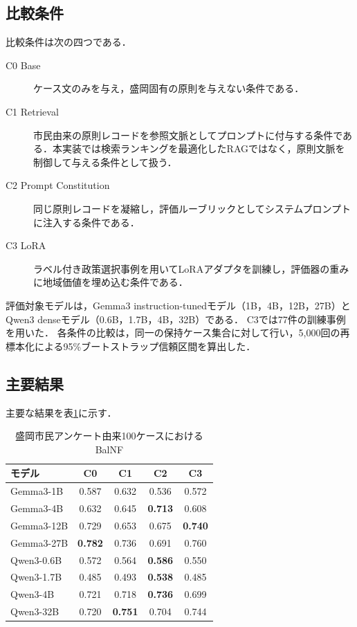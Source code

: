 \subsection{比較条件}

比較条件は次の四つである．

\begin{description}
\item[C0 Base] ケース文のみを与え，盛岡固有の原則を与えない条件である．
\item[C1 Retrieval] 市民由来の原則レコードを参照文脈としてプロンプトに付与する条件である．本実装では検索ランキングを最適化したRAGではなく，原則文脈を制御して与える条件として扱う．
\item[C2 Prompt Constitution] 同じ原則レコードを凝縮し，評価ルーブリックとしてシステムプロンプトに注入する条件である．
\item[C3 LoRA] ラベル付き政策選択事例を用いてLoRAアダプタを訓練し，評価器の重みに地域価値を埋め込む条件である．
\end{description}

評価対象モデルは，Gemma3 instruction-tunedモデル（1B，4B，12B，27B）とQwen3 denseモデル（0.6B，1.7B，4B，32B）である．
C3では77件の訓練事例を用いた．
各条件の比較は，同一の保持ケース集合に対して行い，5,000回の再標本化による95\%ブートストラップ信頼区間を算出した．

\subsection{主要結果}

主要な結果を表\ref{tab:ch8_benchmark_results}に示す．

\begin{table}[htbp]
\centering
\caption{盛岡市民アンケート由来100ケースにおけるBalNF}
\label{tab:ch8_benchmark_results}
\begin{tabular}{lcccc}
\toprule
モデル & C0 & C1 & C2 & C3 \\
\midrule
Gemma3-1B  & 0.587 & 0.632 & 0.536 & 0.572 \\
Gemma3-4B  & 0.632 & 0.645 & \textbf{0.713} & 0.608 \\
Gemma3-12B & 0.729 & 0.653 & 0.675 & \textbf{0.740} \\
Gemma3-27B & \textbf{0.782} & 0.736 & 0.691 & 0.760 \\
Qwen3-0.6B & 0.572 & 0.564 & \textbf{0.586} & 0.550 \\
Qwen3-1.7B & 0.485 & 0.493 & \textbf{0.538} & 0.485 \\
Qwen3-4B   & 0.721 & 0.718 & \textbf{0.736} & 0.699 \\
Qwen3-32B  & 0.720 & \textbf{0.751} & 0.704 & 0.744 \\
\bottomrule
\end{tabular}
\end{table}

